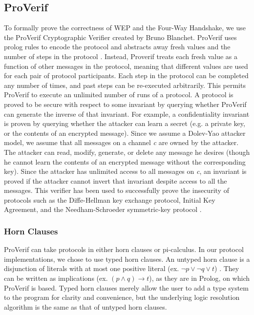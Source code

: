 \documentclass[11pt, twocolumn]{article} %
\begin{document}
{\subsection{ProVerif}
To formally prove the correctness of WEP and the Four-Way Handshake, we use the ProVerif Cryptographic Verifier created by Bruno Blanchet.  ProVerif uses prolog rules to encode the protocol and abstracts away fresh values and the number of steps in the protocol \cite{blanchet01}.  Instead, Proverif treats each fresh value as a function of other messages in the protocol, meaning that different values are used for each pair of protocol participants.  Each step in the protocol can be completed any number of times, and past steps can be re-executed arbitrarily.  This permits ProVerif to execute an unlimited number of runs of a protocol.  A protocol is proved to be secure with respect to some invariant by querying  whether ProVerif can generate the inverse of that invariant.  For example, a confidentiality invariant is proven by querying whether the attacker can learn a secret (e.g. a private key, or the contents of an encrypted message). Since we assume a Dolev-Yao attacker model, we assume that all messages on a channel \textit{c} are owned by the attacker.  The attacker can read, modify, generate, or delete any message he desires (though he cannot learn the contents of an encrypted message without the corresponding key). Since the attacker has unlimited access to all messages on \textit{c}, an invariant is proved if the attacker cannot invert that invariant despite access to all the messages. This verifier has been used to successfully prove the insecurity of protocols such as the Diffe-Hellman key exchange protocol, Initial Key Agreement, and the Needham-Schroeder symmetric-key protocol \cite{lafourcade10, abadi}.

\subsubsection{Horn Clauses}
ProVerif can take protocols in either horn clauses or pi-calculus.  In our protocol implementations, we chose to use typed horn clauses.  An untyped horn clause is a disjunction of literals with at most one positive literal (ex. $ \neg p \lor \neg q \lor t$) \cite{blanchet09}.  They can be written as implications (ex. $(p \land q ) \rightarrow t$), as they are in Prolog, on which ProVerif is based. Typed horn clauses merely allow the user to add a type system to the program for clarity and convenience, but the underlying logic resolution algorithm is the same as that of untyped horn clauses.

}
\end{document}
